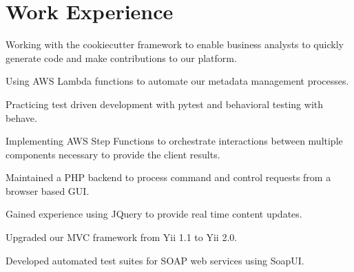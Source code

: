 \documentclass[letterpaper]{deedy-resume}
\begin{document}
\begin{minipage}[t]{0.66\textwidth} %


\section{Work Experience}

\vspace{\topsep} %
\begin{tightitemize}
\item Working with the cookiecutter framework to enable business analysts to quickly generate code and make contributions to our platform.
\item Using AWS Lambda functions to automate our metadata management processes.
\item Practicing test driven development with pytest and behavioral testing with behave.
\item Implementing AWS Step Functions to orchestrate interactions between multiple components necessary to provide the client results.
\end{tightitemize}

\sectionspace

\begin{tightitemize}
\item Maintained a PHP backend to process command and control requests from a browser based GUI.
\item Gained experience using JQuery to provide real time content updates.
\item Upgraded our MVC framework from Yii 1.1 to Yii 2.0.
\item Developed automated test suites for SOAP web services using SoapUI.
\end{tightitemize}

\sectionspace


\end{minipage}
\end{document}

